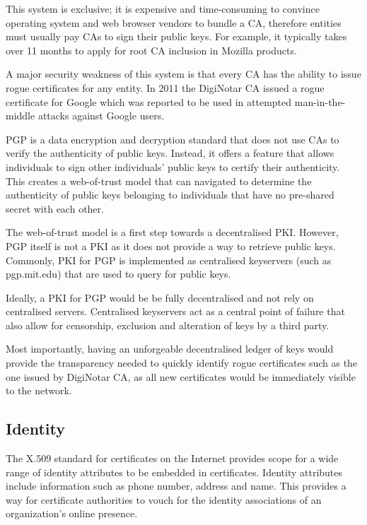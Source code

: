 \documentclass[12pt,a4paper]{report}
\begin{document}
	This system is exclusive; it is expensive and time-consuming to convince operating system and web browser vendors to bundle a CA, therefore entities must usually pay CAs to sign their public keys. For example, it typically takes over 11 months to apply for root CA inclusion in Mozilla products\cite{6}.
	 
	A major security weakness of this system is that every CA has the ability to issue rogue certificates for any entity. In 2011 the DigiNotar CA issued a rogue certificate for Google which was reported to be used in attempted man-in-the-middle attacks against Google users\cite{7}.

	PGP is a data encryption and decryption standard that does not use CAs to verify the authenticity of public keys. Instead, it offers a feature that allows individuals to sign other individuals' public keys to certify their authenticity. This creates a web-of-trust model that can navigated to determine the authenticity of public keys belonging to individuals that have no pre-shared secret with each other.\cite{2}

	The web-of-trust model is a first step towards a decentralised PKI. However, PGP itself is not a PKI as it does not provide a way to retrieve public keys. Commonly, PKI for PGP is implemented as centralised keyservers (such as pgp.mit.edu) that are used to query for public keys.

	Ideally, a PKI for PGP would be be fully decentralised and not rely on centralised servers. Centralised keyservers act as a central point of failure that also allow for censorship, exclusion and alteration of keys by a third party.
	
	Most importantly, having an unforgeable decentralised ledger of keys would provide the transparency needed to quickly identify rogue certificates such as the one issued by DigiNotar CA, as all new certificates would be immediately visible to the network.
	
	\subsection{Identity}
	The X.509 standard for certificates on the Internet provides scope for a wide range of identity attributes to be embedded in certificates.\cite{8} Identity attributes include information such as phone number, address and name. This provides a way for certificate authorities to vouch for the identity associations of an organization's online presence.
	
\end{document}
